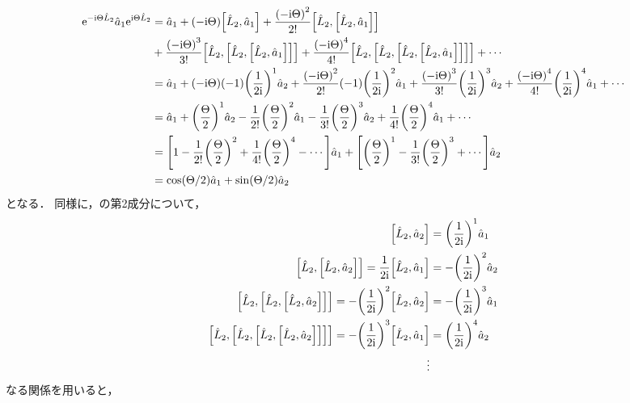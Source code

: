 \documentclass{report}
\begin{document}
    \begin{align}
      \mathrm{e}^{-\mathrm{i}\Theta\hat{L}_2}\hat{a}_1\mathrm{e}^{\mathrm{i}\Theta\hat{L}_2} &= \hat{a}_1 + \qty(-\mathrm{i}\Theta)\qty[\hat{L}_2, \hat{a}_1] + \frac{\qty(-\mathrm{i}\Theta)^2}{2!}\qty[\hat{L}_2, \qty[\hat{L}_2, \hat{a}_1]]\notag \\ 
      &+ \frac{\qty(-\mathrm{i}\Theta)^3}{3!}\qty[\hat{L}_2, \qty[\hat{L}_2, \qty[\hat{L}_2, \hat{a}_1]]] + \frac{\qty(-\mathrm{i}\Theta)^4}{4!}\qty[\hat{L}_2, \qty[\hat{L}_2, \qty[\hat{L}_2, \qty[\hat{L}_2, \hat{a}_1]]]] + \cdots \\ 
      &= \hat{a}_1 + \qty(-\mathrm{i}\Theta)\qty(-1)\qty(\frac{1}{2\mathrm{i}})^1\hat{a}_2 + \frac{\qty(-\mathrm{i}\Theta)^2}{2!}\qty(-1)\qty(\frac{1}{2\mathrm{i}})^2\hat{a}_1 + \frac{\qty(-\mathrm{i}\Theta)^3}{3!}\qty(\frac{1}{2\mathrm{i}})^3\hat{a}_2 + \frac{\qty(-\mathrm{i}\Theta)^4}{4!}\qty(\frac{1}{2\mathrm{i}})^4\hat{a}_1 + \cdots \\ 
      &= \hat{a}_1 + \qty(\frac{\Theta}{2})^1\hat{a}_2 - \frac{1}{2!}\qty(\frac{\Theta}{2})^2\hat{a}_1 - \frac{1}{3!}\qty(\frac{\Theta}{2})^3\hat{a}_2 + \frac{1}{4!}\qty(\frac{\Theta}{2})^4\hat{a}_1 + \cdots \\ 
      &= \qty[1 - \frac{1}{2!}\qty(\frac{\Theta}{2})^2 + \frac{1}{4!}\qty(\frac{\Theta}{2})^4 - \cdots]\hat{a}_1 + \qty[\qty(\frac{\Theta}{2})^1 - \frac{1}{3!}\qty(\frac{\Theta}{2})^3 + \cdots]\hat{a}_2 \\ 
      &= \cos(\Theta / 2)\hat{a}_1 + \sin(\Theta / 2)\hat{a}_2
    \end{align}
    となる．
    同様に，の第2成分について，
    \begin{align}
      \qty[\hat{L}_2, \hat{a}_2] &= \qty(\frac{1}{2\mathrm{i}})^1\hat{a}_1 \\ 
      \qty[\hat{L}_2, \qty[\hat{L}_2, \hat{a}_2]] = \frac{1}{2\mathrm{i}}\qty[\hat{L}_2, \hat{a}_1] &= -\qty(\frac{1}{2\mathrm{i}})^2\hat{a}_2 \\ 
      \qty[\hat{L}_2, \qty[\hat{L}_2, \qty[\hat{L}_2, \hat{a}_2]]] = -\qty(\frac{1}{2\mathrm{i}})^2\qty[\hat{L}_2, \hat{a}_2] &= -\qty(\frac{1}{2\mathrm{i}})^3\hat{a}_1 \\ 
      \qty[\hat{L}_2, \qty[\hat{L}_2, \qty[\hat{L}_2, \qty[\hat{L}_2, \hat{a}_2]]]] = -\qty(\frac{1}{2\mathrm{i}})^3\qty[\hat{L}_2, \hat{a}_1] &= \qty(\frac{1}{2\mathrm{i}})^4\hat{a}_2 \\ 
      \vdots & 
    \end{align}
    なる関係を用いると，
\end{document}
